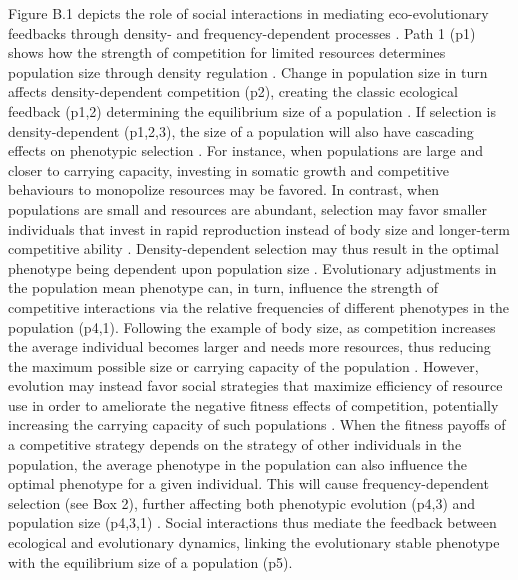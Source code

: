 \documentclass{article}
\begin{document}
\noindent Figure B.1 depicts the role of social interactions in mediating eco-evolutionary feedbacks through density- and frequency-dependent processes \citep{Engen2020}. Path 1 (p1) shows how the strength of competition for limited resources determines population size through density regulation \citep{Gilpin1973a}. Change in population size in turn affects density-dependent competition (p2), creating the classic ecological feedback (p1,2) determining the equilibrium size of a population \citep{Travis2013}. If selection is density-dependent (p1,2,3), the size of a population will also have cascading effects on phenotypic selection  \citep{Mueller1997, Boyce1984}. For instance, when populations are large and closer to carrying capacity, investing in somatic growth and competitive behaviours to monopolize resources may be favored. In contrast, when populations are small and resources are abundant, selection may favor smaller individuals that invest in rapid reproduction instead of body size and longer-term competitive ability \citep{Joshi2001, Wright2018, Engen2017}. Density-dependent selection may thus result in the optimal phenotype being dependent upon population size \citep{Anderson1971, Charlesworth1971}. Evolutionary adjustments in the population mean phenotype can, in turn, influence the strength of competitive interactions via the relative frequencies of different phenotypes in the population \citep{Wright1969} (p4,1). Following the example of body size, as competition increases the average individual becomes larger and needs more resources, thus reducing the maximum possible size or carrying capacity of the population \citep{Engen2020}. However, evolution may instead favor social strategies that maximize efficiency of resource use in order to ameliorate the negative fitness effects of competition, potentially increasing the carrying capacity of such populations \citep{macarthur1967theory,  Boyce1984}. When the fitness payoffs of a competitive strategy depends on the strategy of other individuals in the population, the average phenotype in the population can also influence the optimal phenotype for a given individual. This will cause frequency-dependent selection (see Box 2), further affecting both phenotypic evolution (p4,3) \citep{Heino1998} and population size (p4,3,1) \citep{Svensson2018}. Social interactions thus mediate the feedback between ecological and evolutionary dynamics, linking the evolutionary stable phenotype with the equilibrium size of a population (p5).
\end{document}

